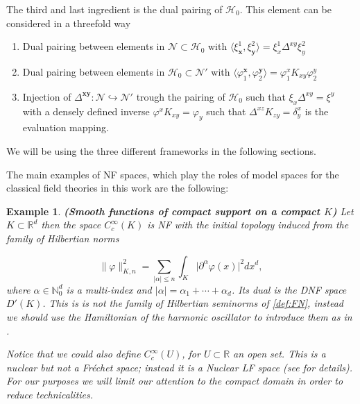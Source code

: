 \documentclass{elsarticle}%
\newtheorem{example}{Example}%
\begin{document}
The third and last ingredient is the dual pairing of $\mathcal{H}_0$. This element can be  considered in a threefold way
\begin{enumerate}[label=\alph*)]
    \item Dual pairing between elements in $\mathcal{N}\subset \mathcal{H}_0$ with $\langle\xi^1_{\mathbf{x}} ,\xi^2_{\mathbf{y}}\rangle =\xi^1_x\Delta^{xy}\xi_y^2$
    \item Dual pairing between elements in  $ \mathcal{H}_0\subset \mathcal{N}'$ with $\langle\varphi_1^{\mathbf{x}} ,\varphi_2^{\mathbf{y}}\rangle =\varphi_1^xK_{xy}\varphi^y_2$ 
    \item Injection of ${\Delta^{\mathbf{xy}}}:\mathcal{N}\hookrightarrow \mathcal{N}'$ trough the pairing of $\mathcal{H}_0$ such that $\xi_x\Delta^{xy}=\xi^y$ with a densely defined inverse $\varphi^xK_{xy}=\varphi_y$ such that $\Delta^{xz}K_{zy}=\delta^x_y$ is the evaluation mapping.
\end{enumerate}
We will be using the three different frameworks in the following sections.

The main examples of NF spaces, which play the roles of model spaces for the classical field theories in this work are the following:

\begin{example}\label{ex:testFunctions}{\bf (Smooth functions of compact support on a compact $K$)}
    Let $K\subset \mathbb{R}^d$ then the space $C^{\infty}_c(K)$ is NF \cite{trevesTopologicalVector1967} with the initial topology induced from the family of Hilbertian norms

\begin{equation}
\label{eq:hilbertianNormsCompactSupport}
\lVert\varphi\rVert_{K,n}^2=\sum_{\lvert\alpha\rvert\leq n}\int_{K}\lvert\partial^\alpha\varphi(x)\rvert^2 dx^d,
\end{equation}
where $\alpha\in \mathbb{N}_0^d$ is a multi-index and $\lvert\alpha\rvert=\alpha_1+\cdots+\alpha_d$.  Its dual is the DNF space $D'(K)$. This is is not the family of Hilbertian seminorms of  \autoref{def:FN}, instead we should use the Hamiltonian of the harmonic oscillator to introduce them as in \cite{hidaWhiteNoise1993}.

Notice that we could also define $C^\infty_c(U)$, for $U\subset \mathbb{R}$ an open set. This is a nuclear  but not  a Fréchet space; instead it is a Nuclear LF space (see \cite{gelfandGeneralizedFunctions1964} for details). For our purposes we will limit our attention to the compact domain in order to reduce  technicalities.
\end{example}
\end{document}
